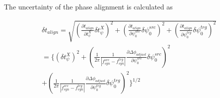 \begin{itemize}
The uncertainty of the phase alignment is calculated as

\begin{equation}
\begin{split}
\label{beating_uncertainty}
\delta t_\mathit{align} =\sqrt {(\frac {\partial t_\mathit{align}}{\partial t_\psi^\mathit{X}} \delta t_\psi^\mathit{X})^2 +(\frac {\partial t_\mathit{align}}{\partial \psi^\mathit{src}_0} \delta\psi^\mathit{src}_0)^2+(\frac {\partial t_\mathit{align}}{\partial \psi^\mathit{trg}_0} \delta\psi^\mathit{trg}_0)^2  }\\
=\biggl\{
   (\delta t_\psi^\mathit{X})^2 +(\frac{1}{2\pi}\frac{1}{|f_{\mathit{syn}}^\mathit{src}-f_{\mathit{syn}}^\mathit{trg}|}\frac {\partial \Delta \phi_\mathit{adjust}}{\partial \psi^\mathit{src}_0}  \delta  \psi^\mathit{src}_0)^2 \\
  +
        (\frac{1}{2\pi}\frac{1}{|f_{\mathit{syn}}^\mathit{src}-f_{\mathit{syn}}^\mathit{trg}|}\frac {\partial \Delta \phi_\mathit{adjust}}{\partial \psi^\mathit{trg}_0}  \delta  \psi^\mathit{trg}_0)^2   
  \biggr\}^{\!1/2}
\end{split}
\end{equation}


\end{itemize}
